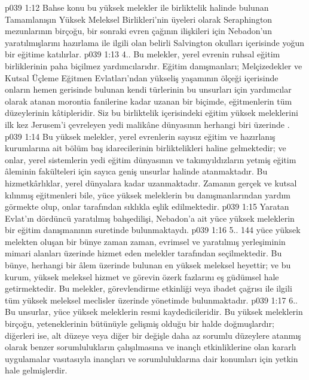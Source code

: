 \vs p039 1:12 Bahse konu bu yüksek melekler ile birliktelik halinde bulunan Tamamlanışın Yüksek Meleksel Birlikleri’nin üyeleri olarak Seraphington mezunlarının birçoğu, bir sonraki evren çağının ilişkileri için Nebadon’un yaratılmışlarını hazırlama ile ilgili olan belirli Salvington okulları içerisinde yoğun bir eğitime katılırlar.
\vs p039 1:13 4.\bibnobreakspace {}. Bu melekler, yerel evrenin ruhsal eğitim birliklerinin paha biçilmez yardımcılarıdır. Eğitim danışmanları; Melçizedekler ve Kutsal Üçleme Eğitmen Evlatları’ndan yükseliş yaşamının ölçeği içerisinde onların hemen gerisinde bulunan kendi türlerinin bu unsurları için yardımcılar olarak atanan morontia fanilerine kadar uzanan bir biçimde, eğitmenlerin tüm düzeylerinin kâtipleridir. Siz bu birliktelik içerisindeki eğitim yüksek meleklerini ilk kez Jerusem’i çevreleyen yedi malikâne dünyasının herhangi biri üzerinde .
\vs p039 1:14 Bu yüksek melekler, yerel evrenlerin sayısız eğitim ve hazırlanış kurumlarına ait bölüm baş idarecilerinin birliktelikleri haline gelmektedir; ve onlar, yerel sistemlerin yedi eğitim dünyasının ve takımyıldızların yetmiş eğitim âleminin fakülteleri için sayıca geniş unsurlar halinde atanmaktadır. Bu hizmetkârlıklar, yerel dünyalara kadar uzanmaktadır. Zamanın gerçek ve kutsal kılınmış eğitmenleri bile, yüce yüksek meleklerin bu danışmanlarından yardım görmekte olup, onlar tarafından sıklıkla eşlik edilmektedir.
\vs p039 1:15 Yaratan Evlat’ın dördüncü yaratılmış bahşedilişi, Nebadon’a ait yüce yüksek meleklerin bir eğitim danışmanının suretinde bulunmaktaydı.
\vs p039 1:16 5.\bibnobreakspace {}. 144 yüce yüksek melekten oluşan bir bünye zaman zaman, evrimsel ve yaratılmış yerleşiminin mimari alanları üzerinde hizmet eden melekler tarafından seçilmektedir. Bu bünye, herhangi bir âlem üzerinde bulunan en yüksek meleksel heyettir; ve bu kurum, yüksek meleksel hizmet ve görevin özerk fazlarını eş güdümsel hale getirmektedir. Bu melekler, görevlendirme etkinliği veya ibadet çağrısı ile ilgili tüm yüksek meleksel meclisler üzerinde yönetimde bulunmaktadır.
\vs p039 1:17 6.\bibnobreakspace {}. Bu unsurlar, yüce yüksek meleklerin resmi kaydedicileridir. Bu yüksek meleklerin birçoğu, yeteneklerinin bütünüyle gelişmiş olduğu bir halde doğmuşlardır; diğerleri ise, alt düzeye veya diğer bir değişle daha az sorumlu düzeylere atanmış olarak benzer sorumlulukların çalışılmasına ve inançlı etkinliklerine olan kararlı uygulamalar vasıtasıyla inançları ve sorumluluklarına dair konumları için yetkin hale gelmişlerdir.
